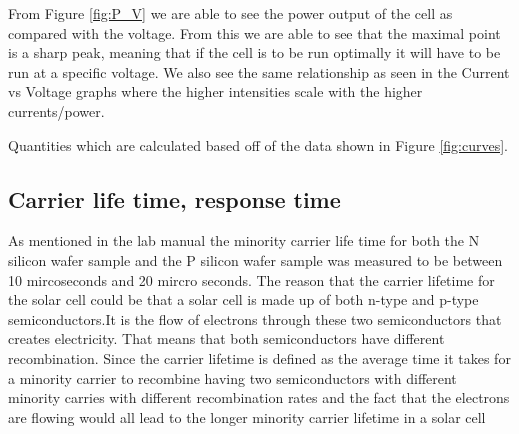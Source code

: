 From Figure \ref{fig:P_V} we are able to see the power output of the cell as compared with the voltage. From this we are able to see that the maximal point is a sharp peak, meaning that if the cell is to be run optimally it will have to be run at a specific voltage. We also see the same relationship as seen in the Current vs Voltage graphs where the higher intensities scale with the higher currents/power.  

\begin{table}[ht]
    \centering
    
    \caption{Quantities which are calculated based off of the data shown in Figure \ref{fig:curves}. }
    \label{tab:I_V}
\end{table}

\clearpage

\subsection{Carrier life time, response time }
 As mentioned in the lab manual the minority carrier life time for both the N silicon wafer sample and the P silicon wafer sample was measured to be between 10 mircoseconds and 20 mircro seconds. The reason that the carrier lifetime for the solar cell could be that a solar cell is made up of both n-type and p-type semiconductors.It is the flow of electrons through these two semiconductors that creates electricity. That means that both semiconductors have different recombination. Since the carrier lifetime is defined as the average time it takes for a minority carrier to recombine having two semiconductors with different minority carries with different recombination rates and the fact that the electrons are flowing would all lead to the longer minority carrier lifetime in a solar cell

